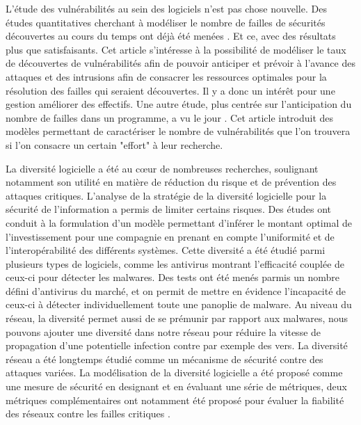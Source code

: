 L'étude des vulnérabilités au sein des logiciels n'est pas chose nouvelle. Des études quantitatives cherchant à modéliser le
nombre de failles de sécurités découvertes au cours du temps ont déjà été menées \cite{vulnerabilityDiscovery}. Et ce, avec des
résultats plus que satisfaisants. Cet article s'intéresse à la possibilité de modéliser le taux de découvertes de vulnérabilités
afin de pouvoir anticiper et prévoir à l'avance des attaques et des intrusions afin de consacrer les ressources optimales pour la résolution des failles qui
seraient découvertes. Il y a donc un intérêt pour une gestion améliorer des effectifs. Une autre étude, plus centrée sur l'anticipation du
nombre de failles dans un programme, a vu le jour \cite{assessingVulnerabilities}. Cet article introduit des modèles
permettant de caractériser le nombre de vulnérabilités que l'on trouvera si l'on consacre un certain "effort" à leur recherche.

La diversité logicielle a été au cœur de nombreuses recherches, soulignant notamment son utilité en matière de réduction du risque \cite{softwareDiversityStateOfTheArt} et de prévention des attaques critiques. L'analyse de la stratégie de la diversité logicielle pour la sécurité de l’information a permis de limiter certains risques. Des études ont conduit à la formulation d'un modèle permettant d'inférer le montant optimal de l’investissement pour une compagnie en prenant en compte l’uniformité et de l’interopérabilité des différents systèmes\cite{}. 
Cette diversité a été étudié parmi plusieurs types de logiciels, comme les antivirus \cite{DiversityForSecurityAntivirus}montrant l’efficacité couplée de ceux-ci pour détecter les malwares. Des tests ont été menés parmis un nombre défini d'antivirus du marché, et on permit de mettre en évidence l'incapacité de ceux-ci à détecter individuellement toute une panoplie de malware.
 Au niveau du réseau, la diversité permet aussi de se prémunir par rapport aux malwares, nous pouvons ajouter une diversité dans notre réseau pour réduire la vitesse de propagation d’une potentielle infection \cite{OptimisingNetwork} contre par exemple des vers. La diversité réseau a été longtemps étudié comme un mécanisme de sécurité contre des attaques variées. La modélisation de la diversité logicielle a été proposé comme une mesure de sécurité en designant et en évaluant une série de métriques, deux métriques complémentaires ont notamment été proposé pour évaluer la fiabilité des réseaux contre les failles critiques \cite{networkDiversity}.

